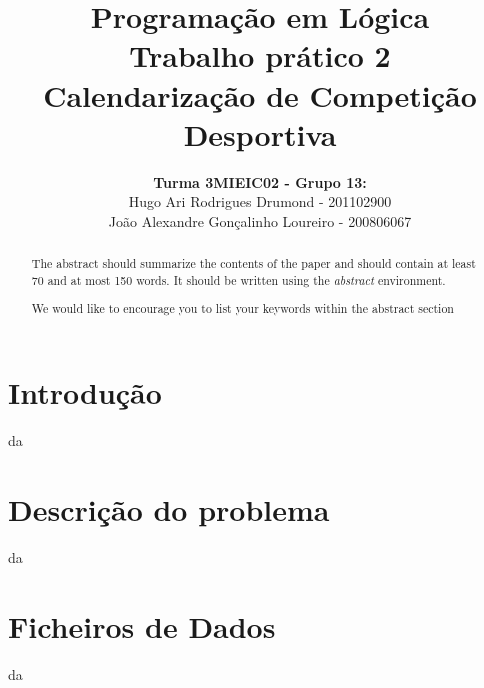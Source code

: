 \documentclass[runningheads,a4paper]{llncs}
\newcommand{\keywords}[1]{\par\addvspace\baselineskip
\noindent\keywordname\enspace\ignorespaces#1}
\begin{document}
\mainmatter

\title{Programação em Lógica\\Trabalho prático 2\\Calendarização de Competição Desportiva \linebreak}


\author{\textbf{Turma 3MIEIC02 - Grupo 13:}\\ Hugo Ari Rodrigues Drumond - 201102900 \\ João Alexandre Gonçalinho Loureiro - 200806067 \linebreak}



\maketitle

\begin{abstract}
The abstract should summarize the contents of the paper and should
contain at least 70 and at most 150 words. It should be written using the
\emph{abstract} environment.
\keywords{We would like to encourage you to list your keywords within
the abstract section}
\end{abstract}
\newpage

\section{Introdução}
da

\section{Descrição do problema}
da

\section{Ficheiros de Dados}
da
\end{document}
